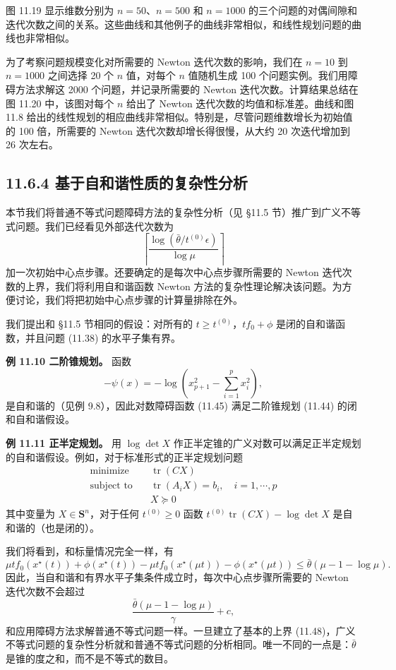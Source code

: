 \documentclass[UTF8,12pt,a4paper,fontset=fandol]{ctexart}
\begin{document}
图 11.19 显示维数分别为 $n=50$、$n=500$ 和 $n=1000$ 的三个问题的对偶间隙和迭代次数之间的关系。这些曲线和其他例子的曲线非常相似，和线性规划问题的曲线也非常相似。

为了考察问题规模变化对所需要的 Newton 迭代次数的影响，我们在 $n=10$ 到 $n=1000$ 之间选择 20 个 $n$ 值，对每个 $n$ 值随机生成 100 个问题实例。我们用障碍方法求解这 2000 个问题，并记录所需要的 Newton 迭代次数。计算结果总结在图 11.20 中，该图对每个 $n$ 给出了 Newton 迭代次数的均值和标准差。曲线和图 11.8 给出的线性规划的相应曲线非常相似。特别是，尽管问题维数增长为初始值的 100 倍，所需要的 Newton 迭代次数却增长得很慢，从大约 20 次迭代增加到 26 次左右。

\subsection*{11.6.4 基于自和谐性质的复杂性分析}

本节我们将普通不等式问题障碍方法的复杂性分析（见 \S 11.5 节）推广到广义不等式问题。我们已经看见外部迭代次数为
\[
\left\lceil\frac{\log(\bar{\theta}/t^{(0)}\epsilon)}{\log\mu}\right\rceil
\]
加一次初始中心点步骤。还要确定的是每次中心点步骤所需要的 Newton 迭代次数的上界，我们将利用自和谐函数 Newton 方法的复杂性理论解决该问题。为方便讨论，我们将把初始中心点步骤的计算量排除在外。

我们提出和 \S 11.5 节相同的假设：对所有的 $t\geq t^{(0)}$，$tf_0+\phi$ 是闭的自和谐函数，并且问题 (11.38) 的水平子集有界。

\noindent\textbf{例 11.10 二阶锥规划。} 函数
\[
-\psi(x)=-\log\left(x_{p+1}^2-\sum_{i=1}^p x_i^2\right),
\]
是自和谐的（见例 9.8），因此对数障碍函数 (11.45) 满足二阶锥规划 (11.44) 的闭和自和谐假设。

\noindent\textbf{例 11.11 正半定规划。} 用 $\log\det X$ 作正半定锥的广义对数可以满足正半定规划的自和谐假设。例如，对于标准形式的正半定规划问题
\[
\begin{aligned}
\text{minimize}\quad & \operatorname{tr}(CX)\\
\text{subject to}\quad & \operatorname{tr}(A_iX)=b_i,\quad i=1,\cdots,p\\
& X\succeq 0
\end{aligned}
\]
其中变量为 $X\in\mathbf{S}^n$，对于任何 $t^{(0)}\geq 0$ 函数 $t^{(0)}\operatorname{tr}(CX)-\log\det X$ 是自和谐的（也是闭的）。

我们将看到，和标量情况完全一样，有
\begin{equation}
\mu tf_0(x^\star(t))+\phi(x^\star(t))-\mu tf_0(x^\star(\mu t))-\phi(x^\star(\mu t))\leq \bar{\theta}(\mu-1-\log\mu).
\tag{11.48}
\end{equation}
因此，当自和谐和有界水平子集条件成立时，每次中心点步骤所需要的 Newton 迭代次数不会超过
\[
\frac{\bar{\theta}(\mu-1-\log\mu)}{\gamma}+c,
\]
和应用障碍方法求解普通不等式问题一样。一旦建立了基本的上界 (11.48)，广义不等式问题的复杂性分析就和普通不等式问题的分析相同。唯一不同的一点是：$\bar{\theta}$ 是锥的度之和，而不是不等式的数目。
\end{document}
